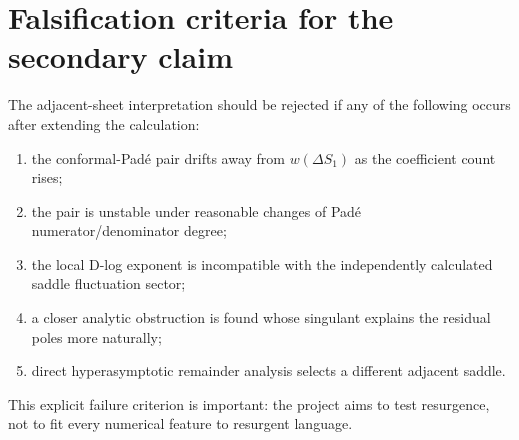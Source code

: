 \documentclass[11pt]{article}
\begin{document}
\section{Falsification criteria for the secondary claim}
The adjacent-sheet interpretation should be rejected if any of the following occurs after extending the calculation:
\begin{enumerate}
 \item the conformal-Pad\'e pair drifts away from $w(\Delta S_1)$ as the coefficient count rises;
 \item the pair is unstable under reasonable changes of Pad\'e numerator/denominator degree;
 \item the local D-log exponent is incompatible with the independently calculated saddle fluctuation sector;
 \item a closer analytic obstruction is found whose singulant explains the residual poles more naturally;
 \item direct hyperasymptotic remainder analysis selects a different adjacent saddle.
\end{enumerate}
This explicit failure criterion is important: the project aims to test resurgence, not to fit every numerical feature to resurgent language.
\end{document}
